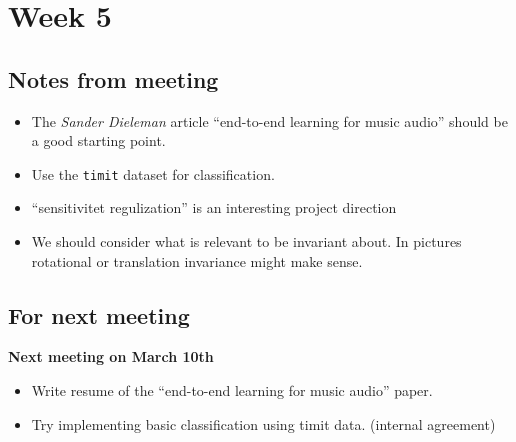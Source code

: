 
\section{Week 5}

\subsection{Notes from meeting}

\begin{itemize}
\item The \textit{Sander Dieleman} article ``end-to-end learning for music
audio'' should be a good starting point.
\item Use the \texttt{timit} dataset for classification.
\item ``sensitivitet regulization'' is an interesting project direction
\item We should consider what is relevant to be invariant about. In pictures
rotational or translation invariance might make sense.
\end{itemize}

\subsection{For next meeting}

\textbf{Next meeting on March 10th}

\begin{itemize}
\item Write resume of the ``end-to-end learning for music audio'' paper.
\item Try implementing basic classification using timit data. (internal
agreement)
\end{itemize}
